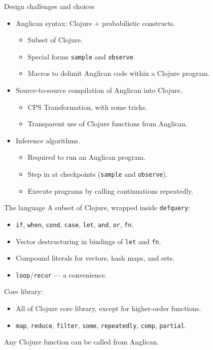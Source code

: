 \documentclass{beamer}
\begin{document}
\begin{frame}{Design challenges and choices}
\begin{itemize}
    \item Anglican syntax: Clojure + probabilistic constructs.
		\begin{itemize}
			\item Subset of Clojure.
			\item Special forms \texttt{sample} and \texttt{observe}.
			\item Macros to delimit Anglican code within a Clojure program.
		\end{itemize}
		\pause
		\bigskip
    \item Source-to-source compilation of Anglican into Clojure.
		\begin{itemize}
			\item CPS Transformation, with some tricks.
			\item Transparent use of Clojure functions from Anglican.
		\end{itemize}
		\pause
		\bigskip
    \item Inference algorithms.
		\begin{itemize}
            \item Required to run an Anglican program.
			\item Step in at checkpoints (\texttt{sample} and \texttt{observe}).
			\item Execute programs by calling continuations repeatedly.
		\end{itemize}
\end{itemize}
\end{frame}

\begin{frame}{The language}
    A subset of Clojure, wrapped inside \texttt{defquery}:
    \begin{itemize}
        \item \texttt{if}, \texttt{when}, \texttt{cond},
            \texttt{case}, \texttt{let}, \texttt{and}, \texttt{or},
            \texttt{fn}. 
        \item Vector destructuring in bindings of \texttt{let} and \texttt{fn}.
        \item Compound literals for vectors, hash maps, and sets.
        \item \texttt{loop}/\texttt{recur} --- a convenience.
    \end{itemize}
    \bigskip
    Core library:
    \begin{itemize}
        \item All of Clojure core library, except for
            higher-order functions.
        \item  \texttt{map}, \texttt{reduce},
\texttt{filter}, \texttt{some}, \texttt{repeatedly},
\texttt{comp}, \texttt{partial}.
    \end{itemize}
    \bigskip
    Any Clojure function can be called from Anglican.
\end{frame}
\end{document}
